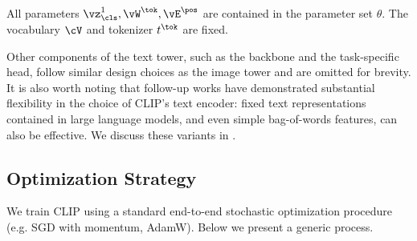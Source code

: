 \documentclass[../../book-main.tex]{subfiles}
\begin{document}
All parameters \(\vz_{\cls}^{1}, \vW^{\tok}, \vE^{\pos}\) are
contained in the parameter set \(\theta\). The vocabulary \(\cV\) and
tokenizer \(t^{\tok}\) are fixed.

Other components of the text tower, such as the backbone and the
task-specific head, follow similar design choices as the image tower
and are omitted for brevity. It is also worth noting that follow-up
works have demonstrated substantial flexibility in the choice of
CLIP's text encoder: fixed text representations contained in large
language models, and even simple bag-of-words features, can also be
effective. We discuss these variants in .




\subsection{Optimization Strategy}
We train CLIP using a standard end-to-end stochastic optimization
procedure (e.g. SGD with momentum, AdamW). Below we present a generic process.
\end{document}
